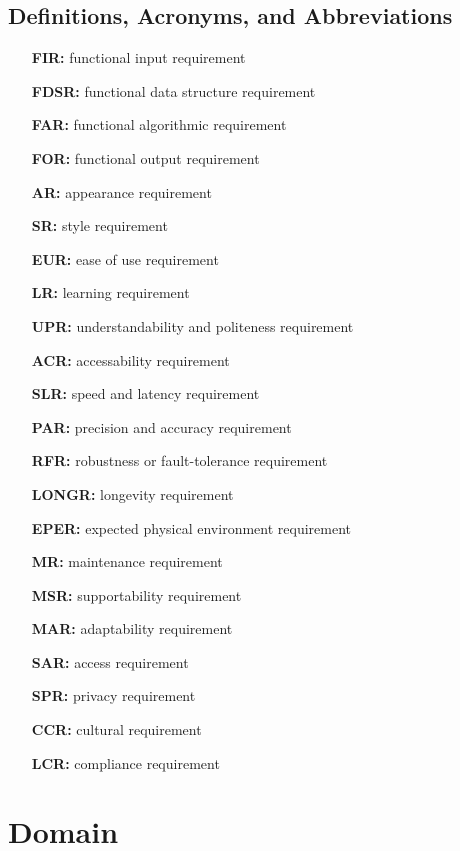 \documentclass[english]{article}
\begin{document}
\subsection{Definitions, Acronyms, and Abbreviations}
\label{sub:definitions_acronyms_and_abbreviations}
\begin{enumerate}[leftmargin=1cm]
	\item[{\bf FIR:}] functional input requirement
	\item[{\bf FDSR:}] functional data structure requirement
	\item[{\bf FAR:}] functional algorithmic requirement
	\item[{\bf FOR:}] functional output requirement
	\item[{\bf AR:}] appearance requirement
	\item[{\bf SR:}] style requirement
	\item[{\bf EUR:}] ease of use requirement
	\item[{\bf LR:}] learning requirement
	\item[{\bf UPR:}] understandability and politeness requirement
    \item[{\bf ACR:}] accessability requirement
    \item[{\bf SLR:}] speed and latency requirement
    \item[{\bf PAR:}] precision and accuracy requirement
    \item[{\bf RFR:}] robustness or fault-tolerance requirement
    \item[{\bf LONGR:}] longevity requirement
    \item[{\bf EPER:}] expected physical environment requirement
    \item[{\bf MR:}] maintenance requirement
    \item[{\bf MSR:}] supportability requirement
    \item[{\bf MAR:}] adaptability requirement
    \item[{\bf SAR:}] access requirement
    \item[{\bf SPR:}] privacy requirement
    \item[{\bf CCR:}] cultural requirement
    \item[{\bf LCR:}] compliance requirement   


\end{enumerate}

\section{Domain}
\label{sec:domain}
\end{document}
